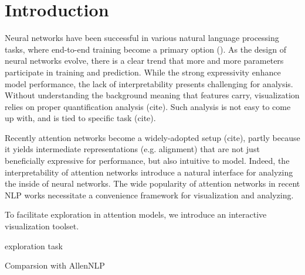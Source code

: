\section{Introduction}

Neural networks have been successful in various natural language processing tasks,
where end-to-end training become a primary option (\cite{}).
As the design of neural networks evolve, there is a clear trend that more and more
parameters participate in training and prediction. While the strong expressivity
enhance model performance, the lack of interpretability presents challenging for analysis.
Without understanding the background meaning that features carry, visualization relies
on proper quantification analysis (cite). Such analysis is not easy to come up with,
and is tied to specific task (cite).


Recently attention networks become a widely-adopted setup (cite), partly because it yields
intermediate representations (e.g. alignment) that are not just beneficially expressive for performance,
but also intuitive to model. Indeed, the interpretability of attention networks introduce
a natural interface for analyzing the inside of neural networks. The wide popularity of attention networks
in recent NLP works necessitate a convenience framework for visualization and analyzing.

To facilitate exploration in attention models, we introduce an interactive visualization toolset.

exploration task

Comparsion with AllenNLP
